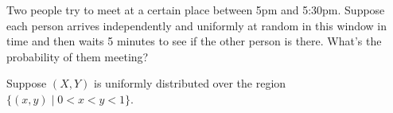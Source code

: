 \documentclass[addpoints,12pt]{exam}
\begin{document}
\begin{questions}
\addpoints

\question[2] Two people try to meet at a certain place between 5pm and 5:30pm. Suppose each person arrives independently and uniformly at random in this window in time and then waits 5 minutes to see if the other person is there. What's the probability of them meeting?

\vspace{2in}

\newpage
\question[7] Suppose $(X,Y)$ is uniformly distributed over the region $\{(x,y) \mid 0 < x < y < 1\}$. 
\noaddpoints
{}
\addpoints

\end{questions}
\end{document}
